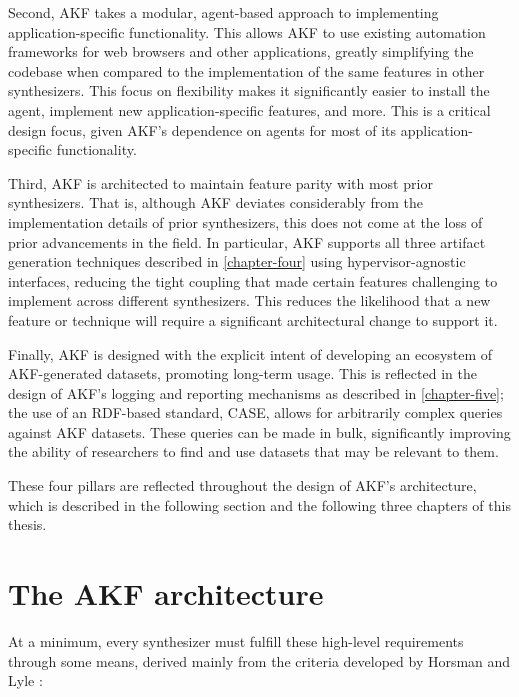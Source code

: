 \documentclass[letterpaper,12pt]{report}
\begin{document}
Second, AKF takes a modular, agent-based approach to implementing
application-specific functionality. This allows AKF to use existing
automation frameworks for web browsers and other applications, greatly
simplifying the codebase when compared to the implementation of the same
features in other synthesizers. This focus on flexibility makes it
significantly easier to install the agent, implement new
application-specific features, and more. This is a critical design
focus, given AKF's dependence on agents for most of its
application-specific functionality.

Third, AKF is architected to maintain feature parity with most prior
synthesizers. That is, although AKF deviates considerably from the
implementation details of prior synthesizers, this does not come at the
loss of prior advancements in the field. In particular, AKF supports all
three artifact generation techniques described in \autoref{chapter-four} using hypervisor-agnostic interfaces, reducing the tight
coupling that made certain features challenging to implement across
different synthesizers. This reduces the likelihood that a new feature
or technique will require a significant architectural change to support
it.

Finally, AKF is designed with the explicit intent of developing an
ecosystem of AKF-generated datasets, promoting long-term usage. This is
reflected in the design of AKF's logging and reporting mechanisms as
described in \autoref{chapter-five}; the use of an
RDF-based standard, CASE, allows for arbitrarily complex queries against
AKF datasets. These queries can be made in bulk, significantly improving
the ability of researchers to find and use datasets that may be relevant
to them.

These four pillars are reflected throughout the design of AKF's
architecture, which is described in the following section and the
following three chapters of this thesis.

\section{The AKF architecture}\label{the-akf-architecture}

At a minimum, every synthesizer must fulfill these high-level
requirements through some means, derived mainly from the criteria
developed by Horsman and Lyle
\cite{horsmanDatasetConstructionChallenges2021}:
\end{document}
